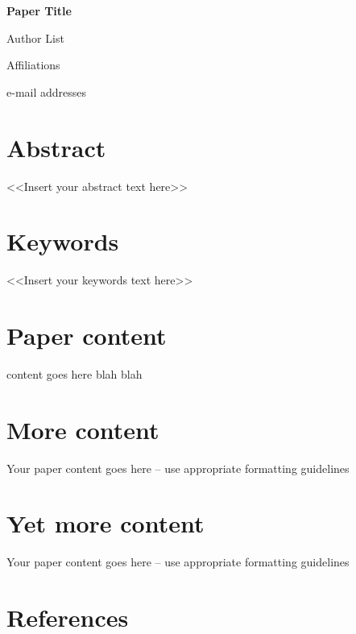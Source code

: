 \documentclass[10pt]{article} %
\begin{document}

\begin{center}
    {\fontsize{14pt}{14pt}\selectfont \textbf{Paper Title}\par}
    \vspace{\baselineskip}
    {\fontsize{10pt}{10pt}\selectfont Author List\par}
    \vspace{\baselineskip}
    {\fontsize{10pt}{10pt}\selectfont Affiliations\par}
    {\fontsize{10pt}{10pt}\selectfont e-mail addresses\par}
\end{center}

\section*{Abstract}
{\fontsize{9pt}{9pt}\selectfont <<Insert your abstract text here>>\par}

\section*{Keywords}
{\fontsize{10pt}{10pt}\selectfont <<Insert your keywords text here>>\par}

\section{Paper content}

content goes here blah blah\par 

\section{More content}
Your paper content goes here – use appropriate formatting guidelines 

\section{Yet more content}
Your paper content goes here – use appropriate formatting guidelines 
\section{References}
\begingroup
\renewcommand{\section}[2]{} %

\endgroup
\end{document}
